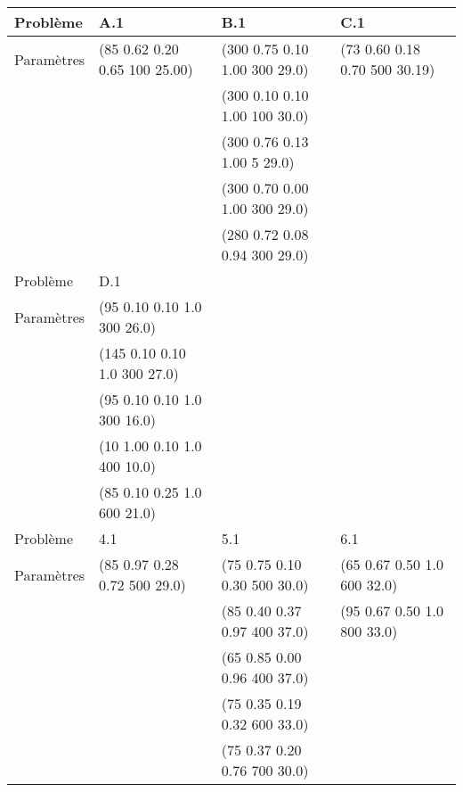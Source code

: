\begin{tabular}{l*{3}{C{148pt}}}
	\toprule
	Problème   & A.1                           & B.1                           & C.1 \\
	\midrule
	Paramètres & (85 0.62 0.20 0.65 100 25.00) & (300 0.75 0.10 1.00 300 29.0) & (73 0.60 0.18 0.70 500 30.19) \\
	           &                               & (300 0.10 0.10 1.00 100 30.0) & \\
	           &                               & (300 0.76 0.13 1.00 5   29.0) & \\
	           &                               & (300 0.70 0.00 1.00 300 29.0) & \\
	           &                               & (280 0.72 0.08 0.94 300 29.0) & \\
	\bottomrule
	\toprule
	Problème   & D.1 & & \\
	\midrule
	Paramètres & (95  0.10 0.10 1.0 300 26.0) & & \\
	           & (145 0.10 0.10 1.0 300 27.0) & & \\
	           & (95  0.10 0.10 1.0 300 16.0) & & \\
	           & (10  1.00 0.10 1.0 400 10.0) & & \\
	           & (85  0.10 0.25 1.0 600 21.0) & & \\
	\bottomrule
	\toprule
	Problème   & 4.1                          & 5.1                          & 6.1 \\
	\midrule
	Paramètres & (85 0.97 0.28 0.72 500 29.0) & (75 0.75 0.10 0.30 500 30.0) & (65 0.67 0.50 1.0 600 32.0) \\
	           &                              & (85 0.40 0.37 0.97 400 37.0) & (95 0.67 0.50 1.0 800 33.0) \\
	           &                              & (65 0.85 0.00 0.96 400 37.0) & \\
	           &                              & (75 0.35 0.19 0.32 600 33.0) & \\
	           &                              & (75 0.37 0.20 0.76 700 30.0) & \\
	\bottomrule
\end{tabular}

